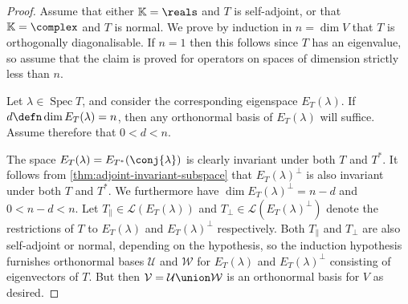\documentclass[article, a4paper, 11pt, oneside]{memoir}
\numberwithin{equation}{chapter}
\newcommand{\calL}{\mathcal{L}}
\newcommand{\calV}{\mathcal{V}}
\newcommand{\calW}{\mathcal{W}}
\newcommand{\calU}{\mathcal{U}}
\DeclareMathOperator{\spec}{Spec}
\begin{document}
\begin{proof}
    Assume that either $\mathbb{K} = \reals$ and $T$ is self-adjoint, or that $\mathbb{K} = \complex$ and $T$ is normal. We prove by induction in $n = \dim V$ that $T$ is orthogonally diagonalisable. If $n = 1$ then this follows since $T$ has an eigenvalue, so assume that the claim is proved for operators on spaces of dimension strictly less than $n$.

    Let $\lambda \in \spec T$, and consider the corresponding eigenspace $E_T(\lambda)$. If $d \defn \dim E_T(\lambda) = n$, then any orthonormal basis of $E_T(\lambda)$ will suffice. Assume therefore that $0 < d < n$.

    The space $E_T(\lambda) = E_{T^*}(\conj{\lambda})$ is clearly invariant under both $T$ and $T^*$. It follows from \cref{thm:adjoint-invariant-subspace} that $E_T(\lambda)^\perp$ is also invariant under both $T$ and $T^*$. We furthermore have $\dim E_T(\lambda)^\perp = n-d$ and $0 < n-d < n$. Let $T_\parallel \in \calL(E_T(\lambda))$ and $T_\perp \in \calL(E_T(\lambda)^\perp)$ denote the restrictions of $T$ to $E_T(\lambda)$ and $E_T(\lambda)^\perp$ respectively. Both $T_\parallel$ and $T_\perp$ are also self-adjoint or normal, depending on the hypothesis, so the induction hypothesis furnishes orthonormal bases $\calU$ and $\calW$ for $E_T(\lambda)$ and $E_T(\lambda)^\perp$ consisting of eigenvectors of $T$. But then $\calV = \calU \union \calW$ is an orthonormal basis for $V$ as desired.
\end{proof}
\end{document}
